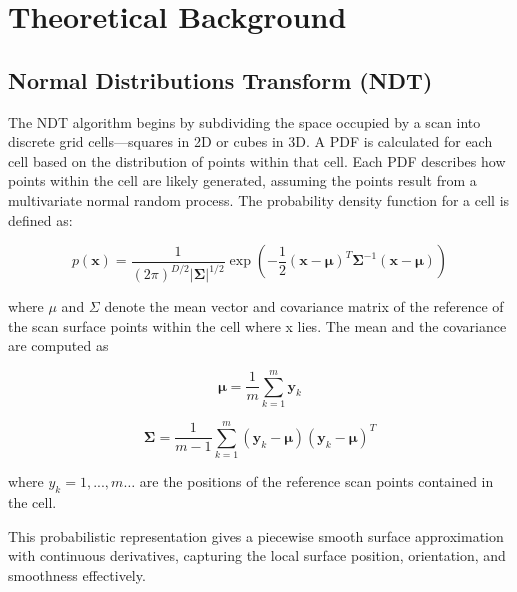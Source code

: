 \section{Theoretical Background }

\subsection{Normal Distributions Transform (NDT)}
\label{sec:Normal Distributions Transform}

The NDT algorithm begins by subdividing the space occupied by a scan into discrete grid cells---squares in 2D or cubes in 3D. A PDF is calculated for each cell based on the distribution of points within that cell. Each PDF describes how points within the cell are likely generated, assuming the points result from a multivariate normal random process. The probability density function for a cell is defined as:

\begin{equation}
p(\mathbf{x}) = \frac{1}{(2\pi)^{D/2}|\mathbf{\Sigma}|^{1/2}} \exp\left(-\frac{1}{2}(\mathbf{x}-\mathbf{\mu})^T\mathbf{\Sigma}^{-1}(\mathbf{x}-\mathbf{\mu})\right)
\end{equation}

where $\mu$ and $\Sigma$ denote the mean vector and covariance matrix of the reference of the scan surface points within the cell where x lies. The mean and the covariance are computed as 

\begin{equation}
\mathbf{\mu} = \frac{1}{m} \sum_{k=1}^{m} \mathbf{y}_k
\end{equation}

\begin{equation}
\mathbf{\Sigma} = \frac{1}{m - 1} \sum_{k=1}^{m} (\mathbf{y}_k - \mathbf{\mu})(\mathbf{y}_k - \mathbf{\mu})^T
\end{equation}

where $y_k = 1 ,..., m  \ldots$  are the positions of the reference scan points contained in the cell.

This probabilistic representation gives a piecewise smooth surface approximation with continuous derivatives, capturing the local surface position, orientation, and smoothness effectively.

